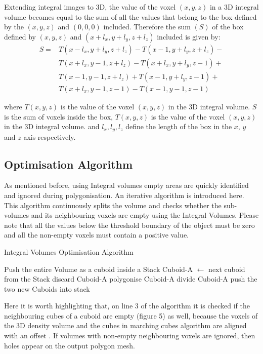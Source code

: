 \documentclass{subfiles}
\begin{document}
Extending integral images to 3D, the value of the voxel $(x ,y, z)$ in a 3D integral volume becomes equal to the sum of all the values that belong to the box defined by the $(x, y, z)$ and $(0, 0, 0)$ included. 
Therefore the sum $(S)$ of the box defined by $(x, y, z)$ and $(x+l_x, y+l_y, z+l_z)$ included is given by:
\begin{equation}
\begin{split}
S = & T(x-l_x,y+l_y,z+l_z) - 
T(x-1,y+l_y,z+l_z) - \\
&  T(x+l_x,y-1,z+l_z) - 	
T(x+l_x,y+l_y,z-1) + \\
&  T(x-1,y-1,z+l_z)   +
T(x-1,y+l_y,z-1)   +  \\
&  T(x+l_x,y-1,z-1)   -
T(x-1,y-1,z-1)
\end{split}
\end{equation}

where 	$T(x, y, z)$ is the value of the voxel $(x, y, z)$ in the 3D integral volume.  
$S$ is the sum of voxels inside the box, $T(x, y, z)$ is the value of the voxel $(x, y, z)$ in the 3D integral volume. and $l_x, l_y, l_z$ define the length of the box in the $x$, $y$ and $z$ axis respectively. 



\subsection{Optimisation Algorithm}\label{sec:IVoptApproach}
As mentioned before, using Integral volumes empty areas are quickly identified and ignored during polygonisation. An iterative algorithm is introduced here. This algorithm continuously splits the volume and checks whether the sub-volumes and its neighbouring voxels are empty using the Integral Volumes. Please note that all the values below the threshold boundary of the object must be zero and all the non-empty voxels must contain a positive value.  

\begin{algorithm}
	\caption{Integral Volumes Optimisation Algorithm}
	\label{alg:IVoptSimple}
	\centering
	\begin{algorithmic}[1]
		\State Push the entire Volume as a cuboid inside a Stack
		\State Cuboid-A   $\gets$  next cuboid from the Stack 
		\State	discard Cuboid-A
		\State polygonise Cuboid-A
		\Else 
		\State divide Cuboid-A
		\State push the two new Cuboids into stack
		\EndIf
		\EndWhile
	\end{algorithmic}
\end{algorithm}
Here it is worth highlighting that, on line 3 of the algorithm it is checked if the neighbouring cubes of a cuboid are empty (figure 5) as well, because the voxels of the 3D density volume and the cubes in marching cubes algorithm are  aligned with an offset \cite{Miltiadou2015}. If volumes with non-empty neighbouring voxels are ignored, then holes appear on the output polygon mesh. 		
\end{document}
